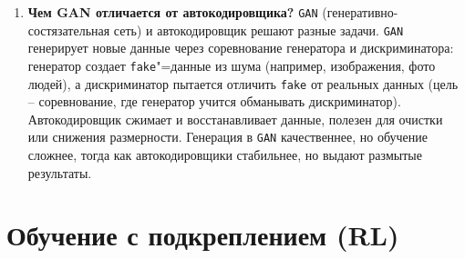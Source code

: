 \documentclass{article}
\begin{document}
\begin{enumerate}
    \item \textbf{Чем GAN отличается от автокодировщика?}
        \texttt{GAN} (генеративно-состязательная сеть) и автокодировщик решают разные задачи. \texttt{GAN} генерирует новые данные через соревнование генератора и дискриминатора: генератор создает \texttt{fake}"=данные из шума (например, изображения, фото людей), а дискриминатор пытается отличить \texttt{fake} от реальных данных (цель -- соревнование, где генератор учится обманывать дискриминатор). Автокодировщик сжимает и восстанавливает данные, полезен для очистки или снижения размерности. Генерация в \texttt{GAN} качественнее, но обучение сложнее, тогда как автокодировщики стабильнее, но выдают размытые результаты.
\end{enumerate}

\section{Обучение с подкреплением (RL)}
\end{document}

